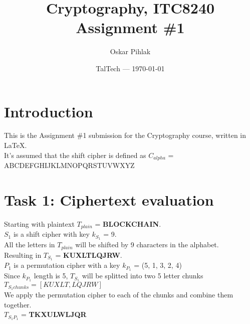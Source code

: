 \documentclass{article}
\title{Cryptography, ITC8240 Assignment \#1} %
\author{Oskar Pihlak} %
\date{TalTech --- \today} %
\begin{document}
\maketitle %


\section*{Introduction} %

This is the Assignment \#1 submission for the Cryptography course, written in LaTeX.\\
It's assumed that the shift cipher is defined as \textit{$C_{alpha}$} = ABCDEFGHIJKLMNOPQRSTUVWXYZ



\section{Task 1: Ciphertext evaluation} %

Starting with plaintext \textit{$T_{plain}$} = \textbf{BLOCKCHAIN}. \\

$S_1$ is a shift cipher with key $k_{S_1}$ = 9. \\
All the letters in \textit{$T_{plain}$} will be shifted by 9 characters in the alphabet.\\
Resulting in \textit{$T_{S_1}$} = \textbf{KUXLTLQJRW}. \\
 
$P_1$ is a permutation cipher with a key $k_{P_1}$ = (5, 1, 3, 2, 4) \\
Since $k_{P_1}$ length is 5, \textit{$T_{S_1}$} will be splitted into two 5 letter chunks\\
\begin{math}
    \mathit{{T_{S_1 chunks}} = [KUXLT, LQJRW]}
\end{math}\\
We apply the permutation cipher to each of the chunks and combine them together.\\
\textit{$T_{S_1 P_1}$} =  \textbf{TKXULWLJQR}
\\
\end{document}
